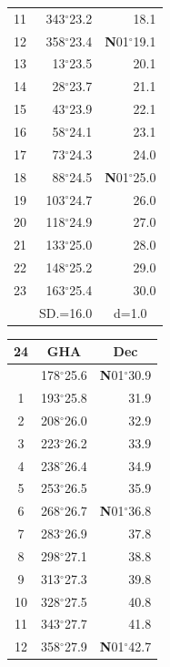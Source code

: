 \documentclass[10pt, a4paper]{report}
\begin{document}
\begin{scriptsize}
\begin{tabular*}{0.2\textwidth}[t]{@{\extracolsep{\fill}}|c|rr|}
11 & 343$^\circ$23.2 & 18.1\\[2Pt]
12 & 358$^\circ$23.4 & \textbf{N}01$^\circ$19.1\\
13 & 13$^\circ$23.5 & 20.1\\
14 & 28$^\circ$23.7 & 21.1\\
15 & 43$^\circ$23.9 & \raisebox{0.24ex}{\boldmath$\cdot$~\boldmath$\cdot$~~}22.1\\
16 & 58$^\circ$24.1 & 23.1\\
17 & 73$^\circ$24.3 & 24.0\\[2Pt]
18 & 88$^\circ$24.5 & \textbf{N}01$^\circ$25.0\\
19 & 103$^\circ$24.7 & 26.0\\
20 & 118$^\circ$24.9 & 27.0\\
21 & 133$^\circ$25.0 & \raisebox{0.24ex}{\boldmath$\cdot$~\boldmath$\cdot$~~}28.0\\
22 & 148$^\circ$25.2 & 29.0\\
23 & 163$^\circ$25.4 & 30.0\\
\hline
\rule{0pt}{2.4ex} & \multicolumn{1}{c}{SD.=16.0} & \multicolumn{1}{c|}{d=1.0}\\
\hline
\end{tabular*}\noindent
\begin{tabular*}{0.2\textwidth}[t]{@{\extracolsep{\fill}}|c|rr|}
\hline
\multicolumn{1}{|c|}{\rule{0pt}{2.6ex}\textbf{24}} & \multicolumn{1}{c}{\textbf{GHA}} & \multicolumn{1}{c|}{\textbf{Dec}}\\
\hline\rule{0pt}{2.6ex}\noindent
0 & 178$^\circ$25.6 & \textbf{N}01$^\circ$30.9\\
1 & 193$^\circ$25.8 & 31.9\\
2 & 208$^\circ$26.0 & 32.9\\
3 & 223$^\circ$26.2 & \raisebox{0.24ex}{\boldmath$\cdot$~\boldmath$\cdot$~~}33.9\\
4 & 238$^\circ$26.4 & 34.9\\
5 & 253$^\circ$26.5 & 35.9\\[2Pt]
6 & 268$^\circ$26.7 & \textbf{N}01$^\circ$36.8\\
7 & 283$^\circ$26.9 & 37.8\\
8 & 298$^\circ$27.1 & 38.8\\
9 & 313$^\circ$27.3 & \raisebox{0.24ex}{\boldmath$\cdot$~\boldmath$\cdot$~~}39.8\\
10 & 328$^\circ$27.5 & 40.8\\
11 & 343$^\circ$27.7 & 41.8\\[2Pt]
12 & 358$^\circ$27.9 & \textbf{N}01$^\circ$42.7\\

\end{tabular*}
\end{scriptsize}
\end{document}
